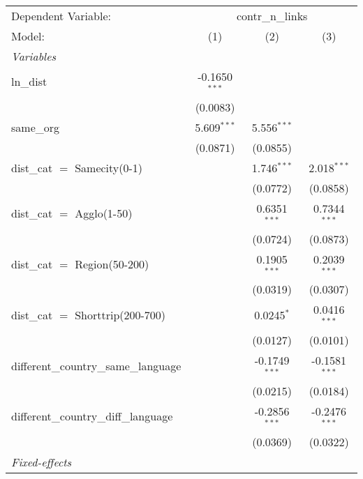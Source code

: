 
\begingroup
\centering
\begin{tabular}{lccc}
   \tabularnewline \midrule \midrule
   Dependent Variable: & \multicolumn{3}{c}{contr\_n\_links}\\
   Model:                                & (1)             & (2)             & (3)\\  
   \midrule
   \emph{Variables}\\
   ln\_dist                              & -0.1650$^{***}$ &                 &   \\   
                                         & (0.0083)        &                 &   \\   
   same\_org                             & 5.609$^{***}$   & 5.556$^{***}$   &   \\   
                                         & (0.0871)        & (0.0855)        &   \\   
   dist\_cat $=$ Samecity(0-1)           &                 & 1.746$^{***}$   & 2.018$^{***}$\\   
                                         &                 & (0.0772)        & (0.0858)\\   
   dist\_cat $=$ Agglo(1-50)             &                 & 0.6351$^{***}$  & 0.7344$^{***}$\\   
                                         &                 & (0.0724)        & (0.0873)\\   
   dist\_cat $=$ Region(50-200)          &                 & 0.1905$^{***}$  & 0.2039$^{***}$\\   
                                         &                 & (0.0319)        & (0.0307)\\   
   dist\_cat $=$ Shorttrip(200-700)      &                 & 0.0245$^{*}$    & 0.0416$^{***}$\\   
                                         &                 & (0.0127)        & (0.0101)\\   
   different\_country\_same\_language    &                 & -0.1749$^{***}$ & -0.1581$^{***}$\\   
                                         &                 & (0.0215)        & (0.0184)\\   
   different\_country\_diff\_language    &                 & -0.2856$^{***}$ & -0.2476$^{***}$\\   
                                         &                 & (0.0369)        & (0.0322)\\   
   \midrule
   \emph{Fixed-effects}\\

\end{tabular}
